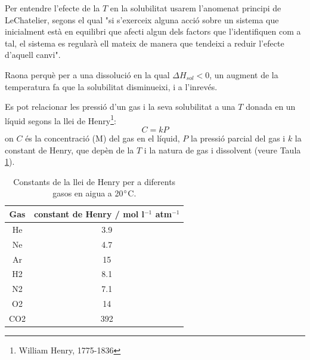 Per entendre l'efecte de la $T$ en la solubilitat usarem l'anomenat principi de LeChatelier, segons el qual "si s'exerceix alguna acció sobre un sistema que inicialment està en equilibri que afecti algun dels factors que l'identifiquen com a tal, el sistema es regularà ell mateix de manera que tendeixi a reduir l'efecte d'aquell canvi".
\begin{exr}
Raona perquè per a una dissolució en la qual $\Delta H_{sol} <0$, un augment de la temperatura fa que la solubilitat disminueixi, i a l'inrevés.
\end{exr}


Es pot relacionar les pressió d'un gas i la seva solubilitat a una $T$ donada en un líquid segons la llei de Henry\footnote{William Henry, 1775-1836}:
\[
C=kP
\]
on $C$ és la concentració (M) del gas en el líquid, $P$ la pressió parcial del gas i $k$ la constant de Henry, que depèn de la $T$ i la natura de gas i dissolvent (veure Taula \ref{tab:Henry}).

\begin{table}[h!]
  \begin{center}
    \caption{Constants de la llei de Henry per a diferents gasos en aigua a 20$\degree$C.}
    \label{tab:Henry}
    \begin{tabular}{cc}
      \hline
      Gas & constant de Henry / mol l$^{-1}$ atm$^{-1}$ \\
      \hline
He &	3.9\\
Ne &	4.7\\
Ar &	15\\
H2 &	8.1\\
N2 &	7.1\\
O2 &	14\\
CO2& 	392\\      
      \hline
    \end{tabular}
  \end{center}
\end{table}